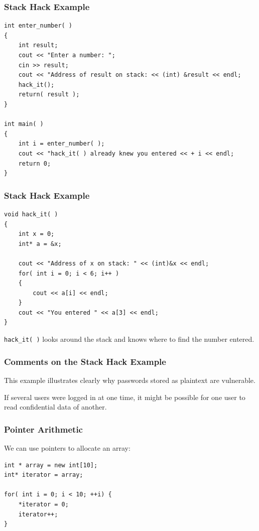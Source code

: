 \begin{frame}[fragile]
\frametitle{Stack Hack Example}
{\scriptsize
\begin{verbatim}
int enter_number( )
{
    int result;
    cout << "Enter a number: ";
    cin >> result;
    cout << "Address of result on stack: << (int) &result << endl;
    hack_it();
    return( result );
}

int main( )
{
    int i = enter_number( );
    cout << "hack_it( ) already knew you entered << + i << endl;
    return 0;
}
\end{verbatim}
}

\end{frame}

\begin{frame}[fragile]
\frametitle{Stack Hack Example}
{\scriptsize
\begin{verbatim}
void hack_it( )
{
    int x = 0;
    int* a = &x;

    cout << "Address of x on stack: " << (int)&x << endl;
    for( int i = 0; i < 6; i++ )
    {
        cout << a[i] << endl;	
    }
    cout << "You entered " << a[3] << endl;
}    
\end{verbatim}
}

\texttt{hack\_it( )} looks around the stack and knows where to find the number entered.

\end{frame}

\begin{frame}
\frametitle{Comments on the Stack Hack Example}

This example illustrates clearly why passwords stored as plaintext are vulnerable.

If several users were logged in at one time, it might be possible for one user to read confidential data of another.

\end{frame}




\begin{frame}[fragile]
\frametitle{Pointer Arithmetic}

We can use pointers to allocate an array:

\begin{verbatim}
int * array = new int[10];
int* iterator = array;

for( int i = 0; i < 10; ++i) {
    *iterator = 0;
    iterator++;
}


\end{verbatim}


\end{frame}

